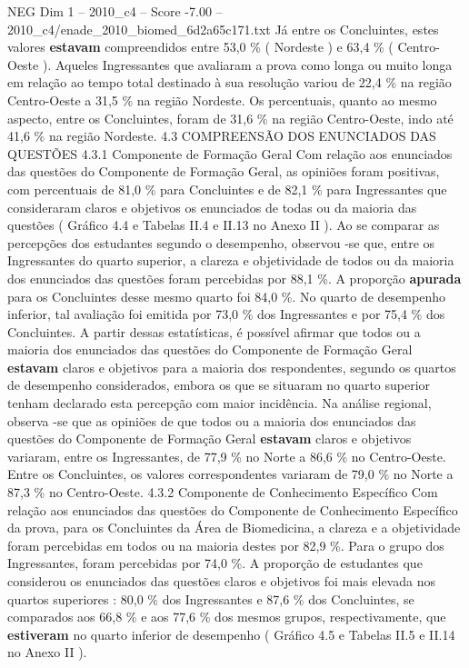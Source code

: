 \begin{textsample}{NEG Dim 1 – 2010\_c4 – Score -7.00 – 2010\_c4/enade\_2010\_biomed\_6d2a65c171.txt}
Já entre os Concluintes, estes valores \textbf{estavam} compreendidos entre 53,0 \% ( Nordeste ) e 63,4 \% ( Centro-Oeste ).
Aqueles Ingressantes que avaliaram a prova como longa ou muito longa em relação ao tempo total destinado à sua resolução variou de 22,4 \% na região Centro-Oeste a 31,5 \% na região Nordeste.
Os percentuais, quanto ao mesmo aspecto, entre os Concluintes, foram de 31,6 \% na região Centro-Oeste, indo até 41,6 \% na região Nordeste. 4.3 COMPREENSÃO DOS ENUNCIADOS DAS QUESTÕES 4.3.1 Componente de Formação Geral Com relação aos enunciados das questões do Componente de Formação Geral, as opiniões foram positivas, com percentuais de 81,0 \% para Concluintes e de 82,1 \% para Ingressantes que consideraram claros e objetivos os enunciados de todas ou da maioria das questões ( Gráfico 4.4 e Tabelas II.4 e II.13 no Anexo II ).
Ao se comparar as percepções dos estudantes segundo o desempenho, observou -se que, entre os Ingressantes do quarto superior, a clareza e objetividade de todos ou da maioria dos enunciados das questões foram percebidas por 88,1 \%.
A proporção \textbf{apurada} para os Concluintes desse mesmo quarto foi 84,0 \%.
No quarto de desempenho inferior, tal avaliação foi emitida por 73,0 \% dos Ingressantes e por 75,4 \% dos Concluintes.
A partir dessas estatísticas, é possível afirmar que todos ou a maioria dos enunciados das questões do Componente de Formação Geral \textbf{estavam} claros e objetivos para a maioria dos respondentes, segundo os quartos de desempenho considerados, embora os que se situaram no quarto superior tenham declarado esta percepção com maior incidência.
Na análise regional, observa -se que as opiniões de que todos ou a maioria dos enunciados das questões do Componente de Formação Geral \textbf{estavam} claros e objetivos variaram, entre os Ingressantes, de 77,9 \% no Norte a 86,6 \% no Centro-Oeste.
Entre os Concluintes, os valores correspondentes variaram de 79,0 \% no Norte a 87,3 \% no Centro-Oeste. 4.3.2 Componente de Conhecimento Específico Com relação aos enunciados das questões do Componente de Conhecimento Específico da prova, para os Concluintes da Área de Biomedicina, a clareza e a objetividade foram percebidas em todos ou na maioria destes por 82,9 \%.
Para o grupo dos Ingressantes, foram percebidas por 74,0 \%.
A proporção de estudantes que considerou os enunciados das questões claros e objetivos foi mais elevada nos quartos superiores : 80,0 \% dos Ingressantes e 87,6 \% dos Concluintes, se comparados aos 66,8 \% e aos 77,6 \% dos mesmos grupos, respectivamente, que \textbf{estiveram} no quarto inferior de desempenho ( Gráfico 4.5 e Tabelas II.5 e II.14 no Anexo II ).

\end{textsample}

